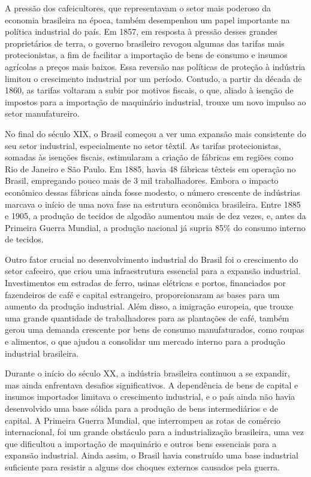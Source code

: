 \documentclass[a4paper,12pt]{article}[abntex2]
\begin{document}
A pressão dos cafeicultores, que representavam o setor mais poderoso da economia brasileira na época, também desempenhou um papel importante na política industrial do país. Em 1857, em resposta à pressão desses grandes proprietários de terra, o governo brasileiro revogou algumas das tarifas mais protecionistas, a fim de facilitar a importação de bens de consumo e insumos agrícolas a preços mais baixos. Essa reversão nas políticas de proteção à indústria limitou o crescimento industrial por um período. Contudo, a partir da década de 1860, as tarifas voltaram a subir por motivos fiscais, o que, aliado à isenção de impostos para a importação de maquinário industrial, trouxe um novo impulso ao setor manufatureiro.

No final do século XIX, o Brasil começou a ver uma expansão mais consistente do seu setor industrial, especialmente no setor têxtil. As tarifas protecionistas, somadas às isenções fiscais, estimularam a criação de fábricas em regiões como Rio de Janeiro e São Paulo. Em 1885, havia 48 fábricas têxteis em operação no Brasil, empregando pouco mais de 3 mil trabalhadores. Embora o impacto econômico dessas fábricas ainda fosse modesto, o número crescente de indústrias marcava o início de uma nova fase na estrutura econômica brasileira. Entre 1885 e 1905, a produção de tecidos de algodão aumentou mais de dez vezes, e, antes da Primeira Guerra Mundial, a produção nacional já supria 85\% do consumo interno de tecidos.

Outro fator crucial no desenvolvimento industrial do Brasil foi o crescimento do setor cafeeiro, que criou uma infraestrutura essencial para a expansão industrial. Investimentos em estradas de ferro, usinas elétricas e portos, financiados por fazendeiros de café e capital estrangeiro, proporcionaram as bases para um aumento da produção industrial. Além disso, a imigração europeia, que trouxe uma grande quantidade de trabalhadores para as plantações de café, também gerou uma demanda crescente por bens de consumo manufaturados, como roupas e alimentos, o que ajudou a consolidar um mercado interno para a produção industrial brasileira.

Durante o início do século XX, a indústria brasileira continuou a se expandir, mas ainda enfrentava desafios significativos. A dependência de bens de capital e insumos importados limitava o crescimento industrial, e o país ainda não havia desenvolvido uma base sólida para a produção de bens intermediários e de capital. A Primeira Guerra Mundial, que interrompeu as rotas de comércio internacional, foi um grande obstáculo para a industrialização brasileira, uma vez que dificultou a importação de maquinário e outros bens essenciais para a expansão industrial. Ainda assim, o Brasil havia construído uma base industrial suficiente para resistir a alguns dos choques externos causados pela guerra.
\end{document}
